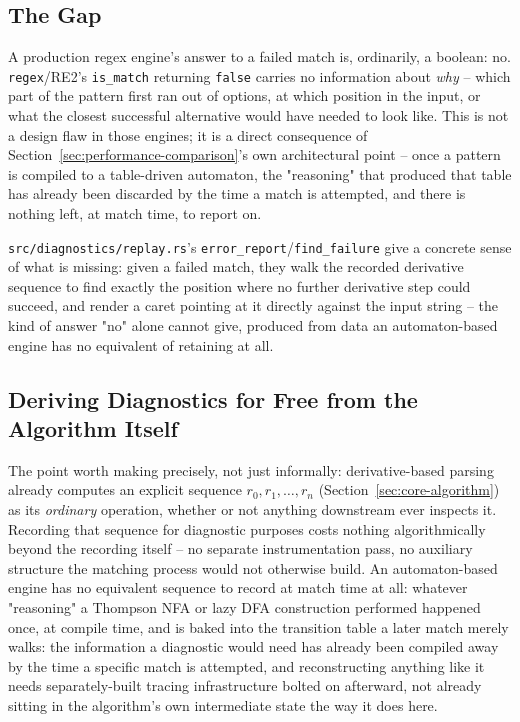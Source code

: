\subsection{The Gap}
\label{sec:diagnostics-gap}

A production regex engine's answer to a failed match is, ordinarily, a
boolean: no. \texttt{regex}/RE2's \texttt{is\_match} returning
\texttt{false} carries no information about \emph{why} -- which part of
the pattern first ran out of options, at which position in the input, or
what the closest successful alternative would have needed to look like.
This is not a design flaw in those engines; it is a direct consequence of
Section~\ref{sec:performance-comparison}'s own architectural point --
once a pattern is compiled to a table-driven automaton, the
"reasoning" that produced that table has already been discarded by the
time a match is attempted, and there is nothing left, at match time, to
report on.

\texttt{src/diagnostics/replay.rs}'s \texttt{error\_report}/\texttt{find\_failure}
give a concrete sense of what is missing: given a failed match, they walk
the recorded derivative sequence to find exactly the position where no
further derivative step could succeed, and render a caret pointing at it
directly against the input string -- the kind of answer "no" alone
cannot give, produced from data an automaton-based engine has no
equivalent of retaining at all.

\subsection{Deriving Diagnostics for Free from the Algorithm Itself}
\label{sec:diagnostics-for-free}

The point worth making precisely, not just informally: derivative-based
parsing already computes an explicit sequence
$r_0, r_1, \ldots, r_n$ (Section~\ref{sec:core-algorithm}) as its
\emph{ordinary} operation, whether or not anything downstream ever
inspects it. Recording that sequence for diagnostic purposes costs
nothing algorithmically beyond the recording itself -- no separate
instrumentation pass, no auxiliary structure the matching process would
not otherwise build. An automaton-based engine has no equivalent
sequence to record at match time at all: whatever "reasoning" a Thompson
NFA or lazy DFA construction performed happened once, at compile time,
and is baked into the transition table a later match merely walks: the
information a diagnostic would need has already been compiled away by
the time a specific match is attempted, and reconstructing anything like
it needs separately-built tracing infrastructure bolted on afterward, not
already sitting in the algorithm's own intermediate state the way it
does here.

